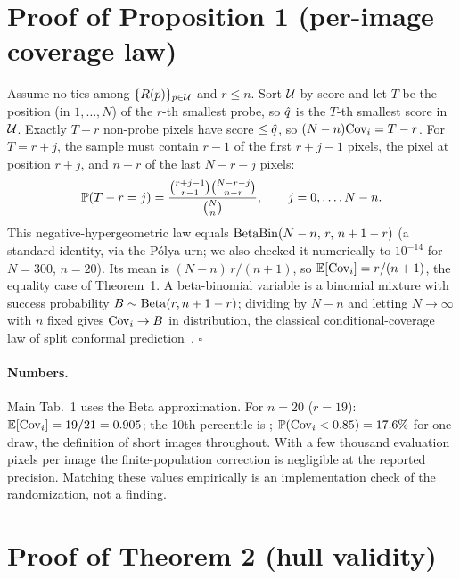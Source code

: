 \documentclass[10pt,twocolumn,letterpaper]{article}
\begin{document}
\section{Proof of Proposition 1 (per-image coverage law)}
\label{supp:proof-budget}

Assume no ties among $\{R(p)\}_{p\in\cU}$ and $r\le n$. Sort $\cU$ by score and let $T$ be the position (in $1,\dots,N$) of the $r$-th smallest probe, so $\qhat$ is the $T$-th smallest score in $\cU$.
Exactly $T-r$ non-probe pixels have score $\le\qhat$, so $(N-n)\Cov_i=T-r$.
For $T=r+j$, the sample must contain $r-1$ of the first $r+j-1$ pixels, the pixel at position $r+j$, and $n-r$ of the last $N-r-j$ pixels:
\begin{equation}
\P(T-r=j)=\frac{\binom{r+j-1}{r-1}\binom{N-r-j}{n-r}}{\binom{N}{n}},\qquad j=0,\dots,N-n .
\end{equation}
This negative-hypergeometric law equals $\BetaBin(N-n,\,r,\,n+1-r)$ (a standard identity, \eg via the P\'olya urn; we also checked it numerically to $10^{-14}$ for $N=300$, $n=20$).
Its mean is $(N-n)\,r/(n+1)$, so $\E[\Cov_i]=r/(n+1)$, the equality case of Theorem~1.
A beta-binomial variable is a binomial mixture with success probability $B\sim\BetaD(r,n+1-r)$; dividing by $N-n$ and letting $N\to\infty$ with $n$ fixed gives $\Cov_i\to B$ in distribution, the classical conditional-coverage law of split conformal prediction~\cite{vovk2012conditional}. \hfill$\square$

\paragraph{Numbers.}
Main Tab.~1 uses the Beta approximation. For $n=20$ ($r=19$): $\E[\Cov_i]=19/21=\NumDualCovTheory$; the 10th percentile is \NumBetaPTenTwenty; $\P(\Cov_i<0.85)=\NumBetaShortOneTwenty\%$ for one draw, the definition of short images throughout. With a few thousand evaluation pixels per image the finite-population correction is negligible at the reported precision. Matching these values empirically is an implementation check of the randomization, not a finding.

\section{Proof of Theorem 2 (hull validity)}
\label{supp:proof-both}
\end{document}

